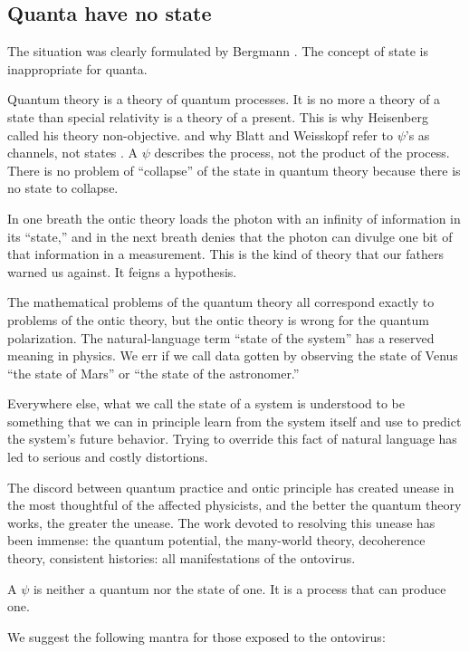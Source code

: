 \documentclass[a4paper,11pt]{article}
\begin{document}
\subsection{Quanta have no state}

The situation was  clearly  formulated  by  
Bergmann \cite{BERGMANN}.
The concept of state is inappropriate for quanta.

Quantum theory is 
a theory of quantum processes.
It is no more a theory of a state
 than special relativity is a theory of a  present.
This is why Heisenberg  called his theory non-objective.
and why  Blatt and Weisskopf
refer to $\psi$'s as channels, not states \cite{BLATT}.
A $\psi$ describes the  process, 
not the product of the process.
There is no problem of ``collapse'' 
of the state in quantum theory
because there is no state to collapse.

In one breath the ontic theory loads 
the photon 
with an infinity of information
in its ``state,''
and in the next breath
denies that the photon can divulge one bit of that information in 
a measurement.
This is the kind of theory that our fathers warned us against.
It feigns a hypothesis.

The  mathematical problems of the quantum theory
all correspond exactly to problems of the ontic theory,
but the ontic theory is wrong for the quantum polarization.
The natural-language term  ``state of the system'' 
has a reserved meaning in physics.
We err if we call  data 
gotten by observing the state of Venus
``the state of Mars''  or ``the state of the astronomer.''

Everywhere else,
what  we call the state of a system 
is understood to be something that we can 
in principle learn  from the system itself
and use to predict
the system's future behavior.
Trying to override  this fact of natural language has
led to serious and costly distortions.

The discord between quantum practice and 
ontic principle has created unease in the most thoughtful of
the affected
physicists,
and 
the better the quantum theory 
works, the greater the unease.
The work devoted to resolving this unease has been immense:
the quantum potential, the many-world theory, 
decoherence theory,
consistent histories:
all 
manifestations  of  the ontovirus.

A $\psi$ is neither a quantum nor the state of one.
It is a process that can produce one.

We suggest the following mantra for those exposed to the ontovirus:
\end{document}
